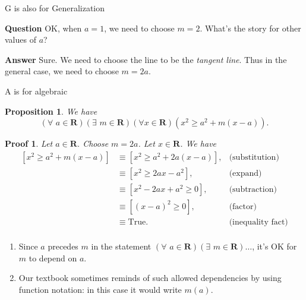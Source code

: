 \documentclass[usenames,dvipsnames,fleqn,leqno,10pt, pdflatex]{beamer}
\newcommand{\reals}{\mathbf{R}}
\newenvironment{PenList}{
  \begin{enumerate}[\textcolor{UNK-blue}{\PencilRightDown}]
    \addtolength{\itemsep}{-0.0\itemsep}}
  {\end{enumerate}}
\newtheorem{myprop}{Proposition}
\newtheorem{myproof}{Proof}
\begin{document}
\begin{frame}{G is also for Generalization}

\textbf{Question} OK, when $a=1$, we need to choose $m=2$. What's the story for other values of $a$?

\textbf{Answer} Sure.  We need to choose the line to be the \emph{tangent line}. Thus in the general case, we need to choose $m = 2 a$.

\vfill

\end{frame}
\begin{frame}{A is for algebraic}

\begin{myprop}We have
$$
\left(\forall \,\, a \in \reals\right)\left(\exists \,\, m \in \reals\right)\left (\forall x \in \reals \right) \left(x^2 \geq a^2 + m (x-a) \right).
$$
\end{myprop}

\begin{myproof} Let $a \in \reals$. Choose $m = 2 a$. Let $x \in \reals$. We have
\begin{align*}
    \left[x^2 \geq a^2 + m (x -a) \right] &\equiv \left[x^2 \geq a^2 + 2a  (x -a) \right],
       &\mbox{(substitution)}\\
       &\equiv \left[x^2 \geq 2 a x - a^2\right], &\mbox{(expand)}\\
        &\equiv \left[x^2 - 2 a x + a^2  \geq 0 \right], &\mbox{(subtraction)}\\
        &\equiv \left[(x-a)^2  \geq 0 \right], &\mbox{(factor)}\\    
        &\equiv \mbox{True}.   &\mbox{(inequality fact)}\\
\end{align*}
\end{myproof}

\begin{PenList}
\item  Since $a$ precedes $m$ in the statement $\left(\forall \,\, a \in \reals\right)\left(\exists \,\, m \in \reals\right) \dots$, it's OK for
$m$ to depend on $a$.

\item Our textbook sometimes reminds of such allowed dependencies by using function 
notation: in this case it would write $m(a)$.

\end{PenList}
\end{frame}
\end{document}
